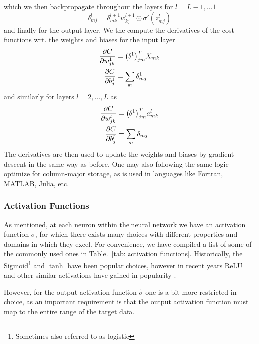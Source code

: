 \documentclass[reprint, english, nofootinbib]{revtex4-2}
\begin{document}
which we then backpropagate throughout the layers for $l = L-1, \dots 1$
\begin{equation}
    \delta^{l}_{mj} = \delta^{l+1}_{mk}w^{l+1}_{kj} \odot \sigma'(z^l_{mj})
\end{equation}
and finally for the output layer. We the compute the derivatives of the cost functions wrt. the weights and biases for the input layer
\begin{align}
    \begin{split}
        \pdv{C}{w^{1}_{jk}} &= \qty(\delta^1)^T_{jm} X_{mk} \\
        \pdv{C}{b^1_{j}} &= \sum_m \delta^1_{mj}
    \end{split}
\end{align}
and similarly for layers $l = 2, \dots, L$ as
\begin{align}
    \begin{split}
        \pdv{C}{w^{l}_{jk}} &= \qty(\delta^1)^T_{jm} a^l_{mk} \\
        \pdv{C}{b^l_{j}} &= \sum_m \delta_{mj}
    \end{split}
\end{align}
The derivatives are then used to update the weights and biases by gradient descent in the same way as before. One may also following the same logic optimize for column-major storage, as is used in languages like Fortran, MATLAB, Julia, etc.

\subsubsection{Activation Functions}
\noindent
As mentioned, at each neuron within the neural network we have an activation function $\sigma$, for which there exists many choices with different properties and domains in which they excel. For convenience, we have compiled a list of some of the commonly used ones in Table.~\ref{tab: activation functions}. Historically, the Sigmoid\footnote{Sometimes also referred to as logistic} and $\tanh$ have been popular choices, however in recent years ReLU and other similar activations have gained in popularity \cite{Aggarwall}.

However, for the output activation function $\tilde\sigma$ one is a bit more restricted in choice, as an important requirement is that the output activation function must map to the entire range of the target data.
\end{document}

